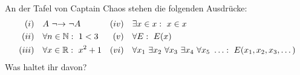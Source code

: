 \begin{aufg}[freestyle]
    An der Tafel von Captain Chaos stehen die folgenden Ausdrücke:
    \begin{align*}
        (i)\quad& A\ {\neg}{\to}\ \neg A&(iv)\quad& \exists x\in x:\ x\in x  \\
        (ii)\quad&   \forall n\in \N:\ 1<3 & (v)\quad& \forall E :\ E(x) \\
        (iii)\quad& \forall x\in \R :\ x^2+1 &(vi)\quad& \forall x_1\ \exists x_2\ \forall x_3\ \exists x_4\ \forall x_5\ \ldots:\ E(x_1,x_2,x_3,\dots)
    \end{align*}
    Was haltet ihr davon?
\end{aufg}

